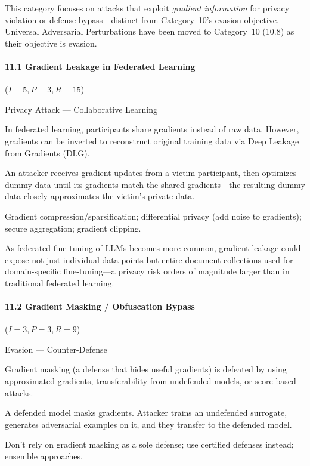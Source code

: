 \documentclass[conference]{IEEEtran}
\newenvironment{attackentry}{\begin{description}[style=unboxed,leftmargin=0cm,itemsep=1pt,parsep=1pt,topsep=2pt,font=\sffamily\small\color{accentdark}]}{\end{description}}
\begin{document}
This category focuses on attacks that exploit \emph{gradient information} for privacy violation or defense bypass---distinct from Category~10's evasion objective. Universal Adversarial Perturbations have been moved to Category~10 (10.8) as their objective is evasion.

\paragraph{11.1 Gradient Leakage in Federated Learning} ($I{=}5, P{=}3, R{=}15$)
\begin{attackentry}
\item[Category:] Privacy Attack --- Collaborative Learning
\item[How it works:] In federated learning, participants share gradients instead of raw data. However, gradients can be inverted to reconstruct original training data via Deep Leakage from Gradients (DLG).
\item[Example:] An attacker receives gradient updates from a victim participant, then optimizes dummy data until its gradients match the shared gradients---the resulting dummy data closely approximates the victim's private data.
\item[Mitigations:] Gradient compression/sparsification; differential privacy (add noise to gradients); secure aggregation; gradient clipping.
\item[Novel Inference (Hypothesized):] As federated fine-tuning of LLMs becomes more common, gradient leakage could expose not just individual data points but entire document collections used for domain-specific fine-tuning---a privacy risk orders of magnitude larger than in traditional federated learning.
\end{attackentry}

\paragraph{11.2 Gradient Masking / Obfuscation Bypass} ($I{=}3, P{=}3, R{=}9$)
\begin{attackentry}
\item[Category:] Evasion --- Counter-Defense
\item[How it works:] Gradient masking (a defense that hides useful gradients) is defeated by using approximated gradients, transferability from undefended models, or score-based attacks.
\item[Example:] A defended model masks gradients. Attacker trains an undefended surrogate, generates adversarial examples on it, and they transfer to the defended model.
\item[Mitigations:] Don't rely on gradient masking as a sole defense; use certified defenses instead; ensemble approaches.
\end{attackentry}
\end{document}
